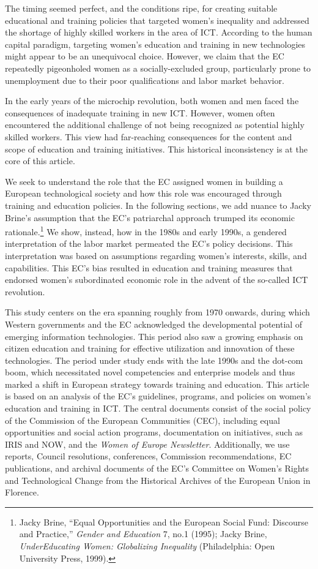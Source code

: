 \documentclass{tufte-handout}
\begin{document}
The timing seemed perfect, and the conditions ripe, for creating
suitable educational and training policies that targeted women's
inequality and addressed the shortage of highly skilled workers in the
area of ICT. According to the human capital paradigm, targeting women's
education and training in new technologies might appear to be an
unequivocal choice. However, we claim that the EC repeatedly pigeonholed
women as a socially-excluded group, particularly prone to unemployment
due to their poor qualifications and labor market behavior.

In the early years of the microchip revolution, both women and men faced
the consequences of inadequate training in new ICT. However, women often
encountered the additional challenge of not being recognized as
potential highly skilled workers. This view had far-reaching
consequences for the content and scope of education and training
initiatives. This historical inconsistency is at the core of this
article.

We seek to understand the role that the EC assigned women in building a
European technological society and how this role was encouraged through
training and education policies. In the following sections, we add
nuance to Jacky Brine's assumption that the EC's patriarchal approach
trumped its economic rationale.\footnote{Jacky Brine, ``Equal
  Opportunities and the European Social Fund: Discourse and Practice,''
  \emph{Gender and Education} 7, no.1 (1995); Jacky Brine,
  \emph{UnderEducating Women: Globalizing Inequality} (Philadelphia:
  Open University Press, 1999).} We show, instead, how in the 1980s and
early 1990s, a gendered interpretation of the labor market permeated the
EC's policy decisions. This interpretation was based on assumptions
regarding women's interests, skills, and capabilities. This EC's bias
resulted in education and training measures that endorsed women's
subordinated economic role in the advent of the so-called ICT
revolution.

This study centers on the era spanning roughly from 1970 onwards, during
which Western governments and the EC acknowledged the developmental
potential of emerging information technologies. This period also saw a
growing emphasis on citizen education and training for effective
utilization and innovation of these technologies. The period under study
ends with the late 1990s and the dot-com boom, which necessitated novel
competencies and enterprise models and thus marked a shift in European
strategy towards training and education. This article is based on an
analysis of the EC's guidelines, programs, and policies on women's
education and training in ICT. The central documents consist of the
social policy of the Commission of the European Communities (CEC),
including equal opportunities and social action programs, documentation
on initiatives, such as IRIS and NOW, and the \emph{Women of Europe
Newsletter}. Additionally, we use reports, Council resolutions,
conferences, Commission recommendations, EC publications, and archival
documents of the EC's Committee on Women's Rights and Technological
Change from the Historical Archives of the European Union in Florence.
\end{document}
